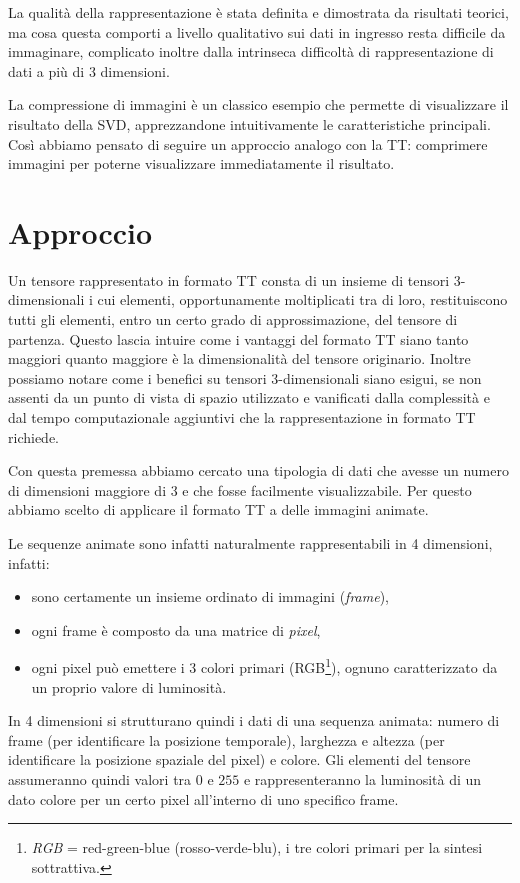 \documentclass[11pt,a4paper]{article}
\begin{document}
  La qualità della rappresentazione è stata definita e dimostrata da risultati teorici, ma cosa questa comporti a livello qualitativo sui dati in ingresso resta difficile da immaginare, complicato inoltre dalla intrinseca difficoltà di rappresentazione di dati a più di 3 dimensioni.

  La compressione di immagini è un classico esempio che permette di visualizzare il risultato della SVD, apprezzandone intuitivamente le caratteristiche principali. Così abbiamo pensato di seguire un approccio analogo con la TT: comprimere immagini per poterne visualizzare immediatamente il risultato.

\section{Approccio}
Un tensore rappresentato in formato TT consta di un insieme di tensori 3-dimensionali i cui elementi, opportunamente moltiplicati tra di loro, restituiscono tutti gli elementi, entro un certo grado di approssimazione, del tensore di partenza.
Questo lascia intuire come i vantaggi del formato TT siano tanto maggiori quanto maggiore è la dimensionalità del tensore originario.
Inoltre possiamo notare come i benefici su tensori 3-dimensionali siano esigui, se non assenti da un punto di vista di spazio utilizzato e vanificati dalla complessità e dal tempo computazionale aggiuntivi che la rappresentazione in formato TT richiede.

Con questa premessa abbiamo cercato una tipologia di dati che avesse un numero di dimensioni maggiore di 3 e che fosse facilmente visualizzabile. Per questo abbiamo scelto di applicare il formato TT a delle immagini animate.

Le sequenze animate sono infatti naturalmente rappresentabili in 4 dimensioni, infatti:
\begin{itemize}
\item sono certamente un insieme ordinato di immagini (\emph{frame}),
\item ogni frame è composto da una matrice di \emph{pixel},
\item ogni pixel può emettere i 3 colori primari (RGB\footnote{\emph{RGB} = red-green-blue (rosso-verde-blu), i tre colori primari per la sintesi sottrattiva.}), ognuno caratterizzato da un proprio valore di luminosità.
\end{itemize}
In 4 dimensioni si strutturano quindi i dati di una sequenza animata: numero di frame (per identificare la posizione temporale), larghezza e altezza (per identificare la posizione spaziale del pixel) e colore. Gli elementi del tensore assumeranno quindi valori tra $0$ e $255$ e rappresenteranno la luminosità di un dato colore per un certo pixel all'interno di uno specifico frame.
\end{document}
